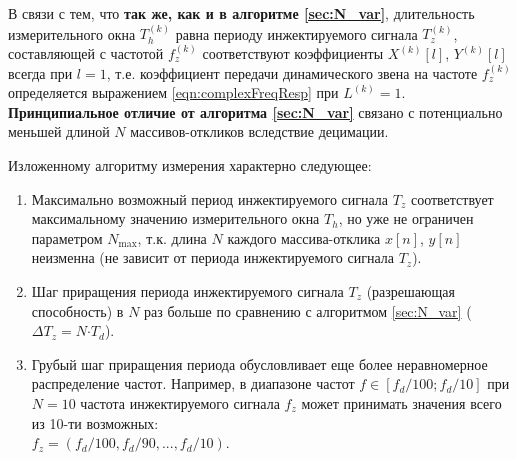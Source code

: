 В связи с тем, что \textbf{так же, как и в алгоритме \ref{sec:N_var}}, длительность измерительного окна ${T^{(k)}_h}$ равна периоду инжектируемого сигнала ${T^{(k)}_z}$, составляющей с частотой ${f^{(k)}_z}$ соответствуют коэффициенты ${X^{(k)}\left[l\right]}$, ${Y^{(k)}\left[l\right]}$ всегда при ${l = 1}$, т.е. коэффициент передачи динамического звена на частоте ${f^{(k)}_z}$ определяется выражением \eqref{eqn:complexFreqResp} при ${L^{(k)} = 1}$. \textbf{Принципиальное отличие от алгоритма \ref{sec:N_var}} связано с потенциально меньшей длиной $N$ массивов-откликов вследствие децимации.

Изложенному алгоритму измерения характерно следующее:
\begin{enumerate}
    \item Максимально возможный период инжектируемого сигнала ${T_z}$ соответствует максимальному значению измерительного окна ${T_h}$, но уже не ограничен параметром ${N_\text{max}}$, т.к. длина $N$ каждого массива-отклика ${x\left[n\right]}$, ${y\left[n\right]}$ неизменна (не зависит от периода инжектируемого сигнала ${T_z}$).
    
    \item Шаг приращения периода инжектируемого сигнала ${T_z}$ (разрешающая способность) в $N$ раз больше по сравнению с алгоритмом \ref{sec:N_var} (${\Delta T_z = N \mathord{\cdot} T_d}$).
    
    \item Грубый шаг приращения периода обусловливает еще более неравномерное распределение частот. Например, в диапазоне частот ${f \in \left[{f_d / 100}; {f_d / 10} \right]}$ при ${N = 10}$ частота инжектируемого сигнала ${f_z}$ может принимать значения всего из 10-ти возможных: \\
    ${f_z = \left({f_d / 100}, {f_d / 90}, ..., {f_d / 10} \right)}$.
\end{enumerate}